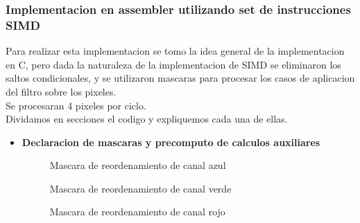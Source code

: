 \subsubsection{Implementacion en assembler utilizando set de instrucciones SIMD}

Para realizar esta implementacion se tomo la idea general de la implementacion en C, 
pero dada la naturaleza de la implementacion de SIMD se eliminaron los saltos condicionales, y se utilizaron mascaras para procesar los casos de aplicacion del filtro sobre los pixeles.\\
Se procesaran 4 pixeles por ciclo.\\

Dividamos en secciones el codigo y expliquemos cada una de ellas.\\

\begin{itemize}
  \item \textbf{Declaracion de mascaras y precomputo de calculos auxiliares}

            \par      
            \bigskip
             \begin{figure}[!ht]
              \centering
              \caption{Mascara de reordenamiento de canal azul}
            \end{figure}


            \par      
            \bigskip
             \begin{figure}[!ht]
              \centering
              \caption{Mascara de reordenamiento de canal verde}
            \end{figure}


            \par      
            \bigskip
             \begin{figure}[!ht]
              \centering
              \caption{Mascara de reordenamiento de canal rojo}
            \end{figure}


\end{itemize}

